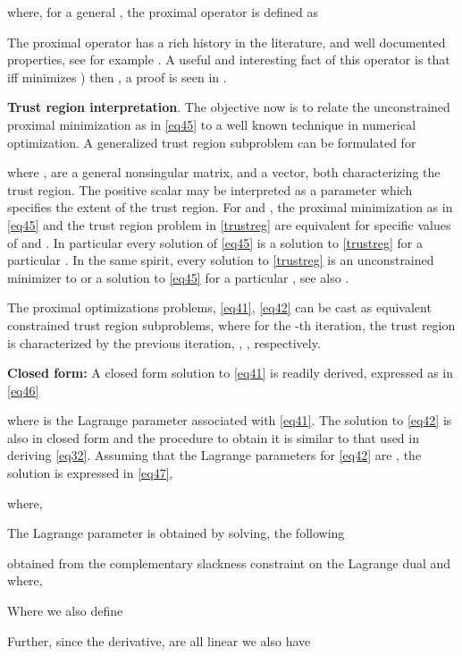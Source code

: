 \documentclass[11pt,draftclsnofoot,onecolumn]{IEEEtran}
\theoremstyle{definition}
\theoremstyle{remark}
\begin{document}
where, for a general , the proximal operator is defined as

The proximal operator has  a rich history in the literature, and well documented properties, see for example \cite{Parikh2013,Rockafeller1973,Rockafeller1976,Bertsekas1994}. A useful and interesting fact of this operator is that iff  minimizes ) then , a proof is seen in \cite{Parikh2013}. 

{\bf Trust region interpretation}. The objective now is to relate the unconstrained proximal minimization as in \eqref{eq45} to  a well known technique in numerical optimization. A generalized trust region subproblem can be formulated for  \cite{More93}

where ,  are a general nonsingular matrix, and a vector, both characterizing the trust region. The positive scalar  may be interpreted as  a parameter which specifies the extent of the trust region. For  and ,  the proximal minimization as in  \eqref{eq45} and the trust region problem in \eqref{trustreg} are equivalent for specific values of  and . In particular every solution of \eqref{eq45} is a solution to \eqref{trustreg} for  a particular . In the same spirit, every solution to \eqref{trustreg} is an unconstrained minimizer to  or a  solution to \eqref{eq45} for a particular , see also \cite{Rockafeller1976,Parikh2013}. 

The proximal optimizations problems, \eqref{eq41}, \eqref{eq42} can be cast as equivalent constrained trust region subproblems, where for the -th iteration, the trust region is characterized by the previous iteration, , , respectively.

{\bf Closed form:} A closed form solution to \eqref{eq41} is readily derived, expressed as in \eqref{eq46} 
 

where  is the Lagrange parameter associated with \eqref{eq41}. The solution to \eqref{eq42} is also in closed form and the procedure to obtain it is similar to that used in deriving \eqref{eq32}. Assuming that the Lagrange parameters for \eqref{eq42} are , the solution is expressed in \eqref{eq47},

where,

The Lagrange parameter  is obtained by solving, the following

obtained from the complementary slackness constraint on the Lagrange dual and where,

 Where we also define
   
 
 Further, since the derivative,  are all linear we also have 
 
\end{document}
